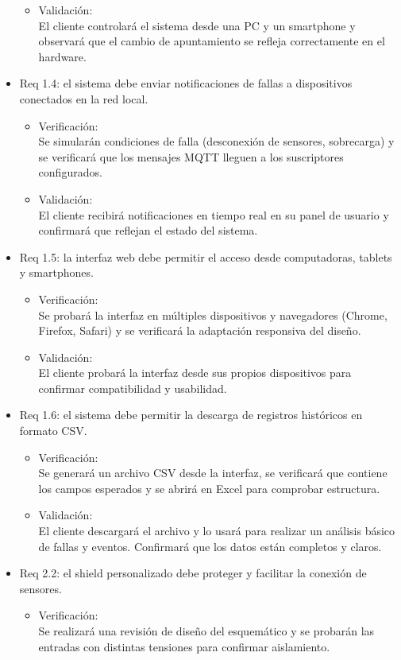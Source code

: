 \documentclass[
11pt, %
]{charter}
\begin{document}
\begin{itemize}
\begin{itemize}
	\item Validación: \\ El cliente controlará el sistema desde una PC y un smartphone y observará que el cambio de apuntamiento se refleja correctamente en el hardware.
\end{itemize}
\newpage
\item Req 1.4: el sistema debe enviar notificaciones de fallas a dispositivos conectados en la red local.
\begin{itemize}
	\item Verificación: \\ Se simularán condiciones de falla (desconexión de sensores, sobrecarga) y se verificará que los mensajes MQTT lleguen a los suscriptores configurados.

	\item Validación: \\ El cliente recibirá notificaciones en tiempo real en su panel de usuario y confirmará que reflejan el estado del sistema.
\end{itemize}

\item Req 1.5: la interfaz web debe permitir el acceso desde computadoras, tablets y smartphones.
\begin{itemize}
	\item Verificación: \\ Se probará la interfaz en múltiples dispositivos y navegadores (Chrome, Firefox, Safari) y se verificará la adaptación responsiva del diseño.
	
	\item Validación: \\ El cliente probará la interfaz desde sus propios dispositivos para confirmar compatibilidad y usabilidad.
\end{itemize}

\item Req 1.6: el sistema debe permitir la descarga de registros históricos en formato CSV.
\begin{itemize}
	\item Verificación: \\ Se generará un archivo CSV desde la interfaz, se verificará que contiene los campos esperados y se abrirá en Excel para comprobar estructura.

	\item Validación: \\ El cliente descargará el archivo y lo usará para realizar un análisis básico de fallas y eventos. Confirmará que los datos están completos y claros.
\end{itemize}
\item Req 2.2: el shield personalizado debe proteger y facilitar la conexión de sensores.
\begin{itemize}
	\item Verificación: \\ Se realizará una revisión de diseño del esquemático y se probarán las entradas con distintas tensiones para confirmar aislamiento.


\end{itemize}
\end{itemize}
\end{document}
